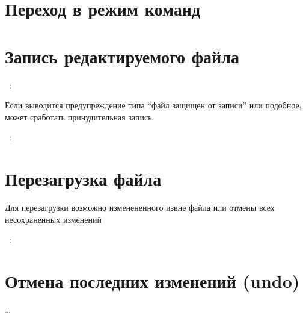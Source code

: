 \section{Переход в режим команд}


\section{Запись редактируемого файла}

\ :\ \ 
\bigskip

Если выводится предупреждение типа ``файл защищен от записи'' или подобное,
может сработать принудительная запись:

\bigskip
{}\ :\ \keys{!}\ \ 

\section{Перезагрузка файла}

Для перезагрузки возможно изменененного извне файла или отмены всех
несохраненных изменений

\bigskip
{}\ :\ \ 

\section{Отмена последних изменений (undo)}

\ldots
